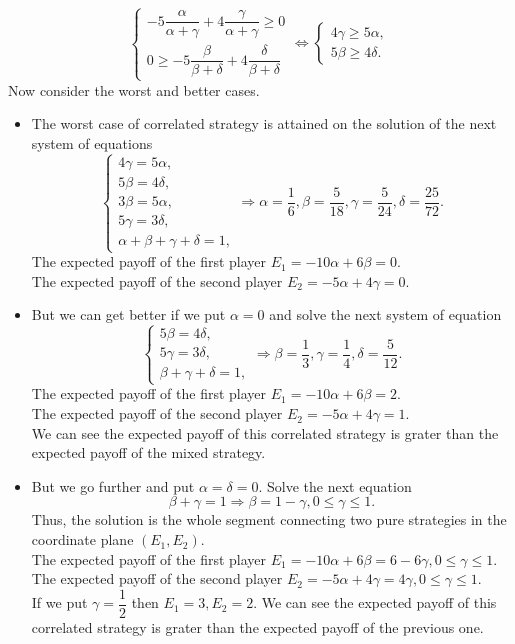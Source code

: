 \documentclass[a4paper, 12pt]{article}
\begin{document}
$$
\begin{cases}
-5 \dfrac{\alpha}{\alpha + \gamma} + 4 \dfrac{\gamma}{\alpha + \gamma} \geqslant 0 \\
0 \geqslant -5 \dfrac{\beta}{\beta + \delta} + 4 \dfrac{\delta}{\beta + \delta}
\end{cases}
\Leftrightarrow
\begin{cases}
4 \gamma \geqslant 5 \alpha, \\
5 \beta \geqslant 4 \delta.
\end{cases}
$$
Now consider the worst and better cases.
\begin{itemize}
	\item The worst case of correlated strategy is attained on the solution of the next system of equations
$$
\begin{cases}
4 \gamma = 5 \alpha, \\
5 \beta = 4 \delta, \\
3 \beta = 5 \alpha, \\
5 \gamma = 3 \delta, \\
\alpha + \beta + \gamma + \delta = 1,
\end{cases}
\Rightarrow
\alpha = \dfrac{1}{6}, \beta = \dfrac{5}{18}, \gamma = \dfrac{5}{24}, \delta = \dfrac{25}{72}.
$$
The expected payoff of the first player $E_1 = -10 \alpha + 6 \beta = 0.$\\
The expected payoff of the second player $E_2 = -5 \alpha + 4 \gamma = 0.$
	\item But we can get better if we put $\alpha = 0$ and solve the next system of equation
$$
\begin{cases}
5 \beta = 4 \delta, \\
5 \gamma = 3 \delta, \\
\beta + \gamma + \delta = 1,
\end{cases}
\Rightarrow
\beta = \dfrac{1}{3}, \gamma = \dfrac{1}{4}, \delta = \dfrac{5}{12}.
$$
The expected payoff of the first player $E_1 = -10 \alpha + 6 \beta = 2.$\\
The expected payoff of the second player $E_2 = -5 \alpha + 4 \gamma = 1.$\\
We can see the expected payoff of this correlated strategy is grater than the expected payoff of the mixed strategy.
	\item But we go further and put $\alpha = \delta = 0.$ Solve the next equation
$$
\beta + \gamma = 1
\Rightarrow
\beta = 1 - \gamma, 0 \leqslant \gamma \leqslant 1.
$$
Thus, the solution is the whole segment connecting two pure strategies in the coordinate plane $(E_1, E_2).$\\
The expected payoff of the first player $E_1 = -10 \alpha + 6 \beta = 6 - 6 \gamma, 0 \leqslant \gamma \leqslant 1.$\\
The expected payoff of the second player $E_2 = -5 \alpha + 4 \gamma = 4 \gamma, 0 \leqslant \gamma \leqslant 1.$\\
If we put $\gamma = \dfrac{1}{2}$ then $E_1 = 3, E_2 = 2.$ We can see the expected payoff of this correlated strategy is grater than the expected payoff of the previous one.
\end{itemize}
\end{document}
